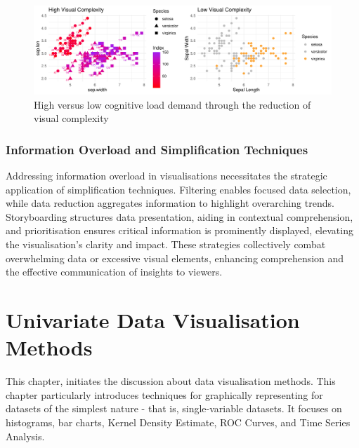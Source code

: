 \documentclass{article}\usepackage[]{graphicx}\usepackage[]{xcolor}
\makeatletter
\def\maxwidth{ %
  \ifdim\Gin@nat@width>\linewidth
    \linewidth
  \else
    \Gin@nat@width
  \fi
}
\newenvironment{knitrout}{}{} %
\numberwithin{equation}{section}
\makeatother
\begin{document}
\begin{knitrout}\scriptsize
{}\color{fgcolor}\begin{figure}[H]

{\centering \includegraphics[width=\maxwidth]{figure/beamer-cogload-plot-1} 

}

\caption[High versus low cognitive load demand through the reduction of visual complexity]{High versus low cognitive load demand through the reduction of visual complexity}\label{fig:cogload-plot}
\end{figure}

\end{knitrout}

\subsubsection{Information Overload and Simplification Techniques}
Addressing information overload in visualisations necessitates the strategic application of simplification techniques. Filtering enables focused data selection, while data reduction aggregates information to highlight overarching trends. Storyboarding structures data presentation, aiding in contextual comprehension, and prioritisation ensures critical information is prominently displayed, elevating the visualisation's clarity and impact. These strategies collectively combat overwhelming data or excessive visual elements, enhancing comprehension and the effective communication of insights to viewers.

\newpage

\section{Univariate Data Visualisation Methods}

This chapter, initiates the discussion about data visualisation methods. This chapter particularly introduces techniques for graphically representing for datasets of the simplest nature - that is, single-variable datasets. It focuses on histograms, bar charts, Kernel Density Estimate, ROC Curves, and Time Series Analysis. 
\end{document}
